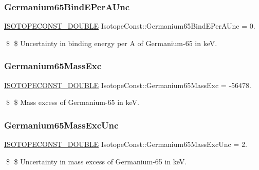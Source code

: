 \subsubsection{\texorpdfstring{Germanium65\+Bind\+E\+Per\+A\+Unc}{Germanium65BindEPerAUnc}}
{\footnotesize\ttfamily \mbox{\hyperlink{group___isotope_const-_macros_ga8f45a7272ce02c0b4c65c44636ed719a}{I\+S\+O\+T\+O\+P\+E\+C\+O\+N\+S\+T\+\_\+\+D\+O\+U\+B\+LE}} Isotope\+Const\+::\+Germanium65\+Bind\+E\+Per\+A\+Unc = 0.}

\$ \$ Uncertainty in binding energy per A of Germanium-\/65 in keV. \mbox{\label{group___isotope_const-_germanium-_ge65_gafbdf37f9741c9bef3a9d29563d44674e}} 
\subsubsection{\texorpdfstring{Germanium65\+Mass\+Exc}{Germanium65MassExc}}
{\footnotesize\ttfamily \mbox{\hyperlink{group___isotope_const-_macros_ga8f45a7272ce02c0b4c65c44636ed719a}{I\+S\+O\+T\+O\+P\+E\+C\+O\+N\+S\+T\+\_\+\+D\+O\+U\+B\+LE}} Isotope\+Const\+::\+Germanium65\+Mass\+Exc = -\/56478.}

\$ \$ Mass excess of Germanium-\/65 in keV. \mbox{\label{group___isotope_const-_germanium-_ge65_ga58a14f6f35c6e36b49faeefadda2c62f}} 
\subsubsection{\texorpdfstring{Germanium65\+Mass\+Exc\+Unc}{Germanium65MassExcUnc}}
{\footnotesize\ttfamily \mbox{\hyperlink{group___isotope_const-_macros_ga8f45a7272ce02c0b4c65c44636ed719a}{I\+S\+O\+T\+O\+P\+E\+C\+O\+N\+S\+T\+\_\+\+D\+O\+U\+B\+LE}} Isotope\+Const\+::\+Germanium65\+Mass\+Exc\+Unc = 2.}

\$ \$ Uncertainty in mass excess of Germanium-\/65 in keV. \mbox{\label{group___isotope_const-_germanium-_ge65_ga3ba8dd99223de5ffade88289d132fc2b}} 
